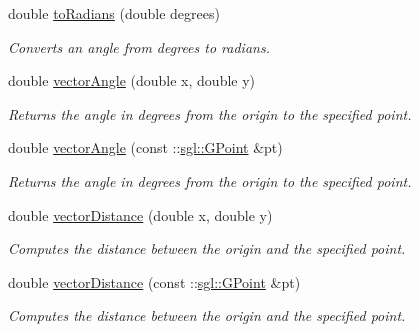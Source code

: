 \begin{DoxyCompactItemize}
double \mbox{\hyperlink{namespacesgl_1_1math_a8e8b5d1633dfb57d0d6056850bdd710c}{to\+Radians}} (double degrees)
\begin{DoxyCompactList}\small\item\em Converts an angle from degrees to radians. \end{DoxyCompactList}\item 
double \mbox{\hyperlink{namespacesgl_1_1math_a51453f572f4bc800c79c499d129c8c0d}{vector\+Angle}} (double x, double y)
\begin{DoxyCompactList}\small\item\em Returns the angle in degrees from the origin to the specified point. \end{DoxyCompactList}\item 
double \mbox{\hyperlink{namespacesgl_1_1math_a2d623f59e6cb1d14a223c443403d568f}{vector\+Angle}} (const \+::\mbox{\hyperlink{structsgl_1_1GPoint}{sgl\+::\+G\+Point}} \&pt)
\begin{DoxyCompactList}\small\item\em Returns the angle in degrees from the origin to the specified point. \end{DoxyCompactList}\item 
double \mbox{\hyperlink{namespacesgl_1_1math_a3bb5a1a1bfbde21be9ed3ae002133143}{vector\+Distance}} (double x, double y)
\begin{DoxyCompactList}\small\item\em Computes the distance between the origin and the specified point. \end{DoxyCompactList}\item 
double \mbox{\hyperlink{namespacesgl_1_1math_a250e1f2b1892e792842af09e46670b84}{vector\+Distance}} (const \+::\mbox{\hyperlink{structsgl_1_1GPoint}{sgl\+::\+G\+Point}} \&pt)
\begin{DoxyCompactList}\small\item\em Computes the distance between the origin and the specified point. \end{DoxyCompactList}\end{DoxyCompactItemize}
